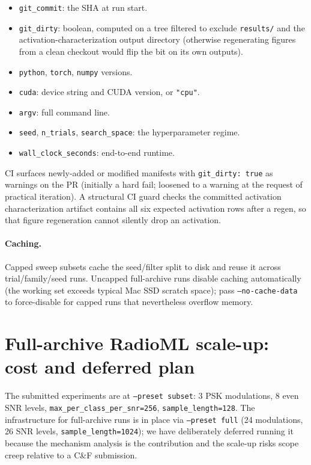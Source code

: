 \documentclass{article}
\newcommand{\code}[1]{\texttt{#1}}
\begin{document}
\begin{itemize}
  \item \code{git\_commit}: the SHA at run start.
  \item \code{git\_dirty}: boolean, computed on a tree filtered to
    exclude \code{results/} and the activation-characterization output
    directory (otherwise regenerating figures from a clean checkout
    would flip the bit on its own outputs).
  \item \code{python}, \code{torch}, \code{numpy} versions.
  \item \code{cuda}: device string and CUDA version, or
    \code{"cpu"}.
  \item \code{argv}: full command line.
  \item \code{seed}, \code{n\_trials}, \code{search\_space}: the
    hyperparameter regime.
  \item \code{wall\_clock\_seconds}: end-to-end runtime.
\end{itemize}

CI surfaces newly-added or modified manifests with
\code{git\_dirty: true} as warnings on the PR (initially a hard fail;
loosened to a warning at the request of practical iteration). A
structural CI guard checks the committed activation characterization
artifact contains all six expected activation rows after a regen, so
that figure regeneration cannot silently drop an activation.

\paragraph{Caching.} Capped sweep subsets cache the seed/filter split
to disk and reuse it across trial/family/seed runs. Uncapped
full-archive runs disable caching automatically (the working set
exceeds typical Mac SSD scratch space); pass \code{--no-cache-data}
to force-disable for capped runs that nevertheless overflow memory.

\section{Full-archive RadioML scale-up: cost and deferred plan}
\label{app:scale-up}

The submitted experiments are at \code{--preset subset}: 3 PSK
modulations, 8 even SNR levels, \code{max\_per\_class\_per\_snr=256},
\code{sample\_length=128}. The infrastructure for full-archive runs is
in place via \code{--preset full} (24 modulations, 26 SNR levels,
\code{sample\_length=1024}); we have deliberately deferred running it
because the mechanism analysis is the contribution and the scale-up
risks scope creep relative to a C\&F submission.
\end{document}
